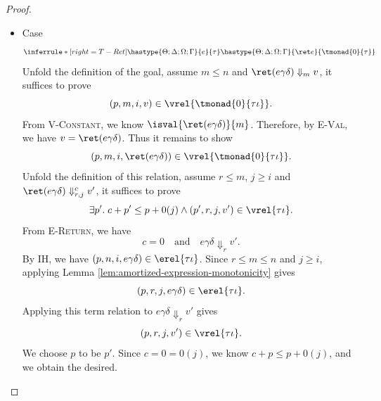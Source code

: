 \begin{proof}
\begin{itemize}
\begin{itemize}
\item {Subcase $m=k+1$.}
From \textsc{E-NappInd}, there exist $x, e', v_2$ and $v'$ such that
\[
  e_1\gamma\delta \Downarrow_{k+1}\delay(\tlam{x}{e'}), \quad
  e_2\gamma\delta \Downarrow_{k+1}\delay v_2, \quad
  e'[v_2/x] \Downarrow_k v',\quad v =\delay v'.
\]
IH1 and IH2 give
\[
  (p_1, n, i, e_1\gamma\delta)\in\erel{\triangleright(\tau_1\iota\multimap\tau_2\iota)},
  \quad
  (p_2, n, i, e_2\gamma\delta)\in\erel{\triangleright\tau_1\iota}.
\]
Since $k+1 \leq n$, instantiate these two term relations with $e_1\gamma\delta \Downarrow_{k+1}\delay(\tlam{x}{e'})$
and $e_2\gamma\delta \Downarrow_{k+1}\delay v_2$ respectively, we have
\[
  (p_1, k+1, i, \delay(\tlam{x}{e'}))\in\vrel{\triangleright(\tau_1\iota\multimap\tau_2\iota)},
  \quad
  (p_2, k+1, i, \delay v_2)\in\vrel{\triangleright\tau_1\iota}.
\]
Unfolding the definitions of the relations gives
\[
  (p_1, k, i+1, \tlam{x}{e'})\in\vrel{\tau_1\iota\multimap\tau_2\iota},
  \quad
  (p_2, k, i+1, v_2)\in\vrel{\tau_1\iota}.
\]
Unfolding the first value relation and instantiating it with $p_2, k, i+1$ and the second value relation gives
\[(p_1+p_2, k, i+1, e'[v_2/x])\in\erel{\tau_2\iota}.\]
Instantiating this term relation with $e'[v_2/x]\Downarrow_k v'$
gives $(p_1+p_2, k, i+1, v')\in\vrel{\tau_2\iota}$. Since $p_1+p_2 = p$, by the definition of
$\vrel{\triangleright\tau_2\iota}$, we have the desired:
\[(p, k+1, i, \delay v')\in\vrel{\triangleright\tau_2\iota}.\]
\end{itemize}

\item Case
\[
  \inferrule*[right=T-Ret]
        {\hastype{\Theta;\Delta;\Omega;\Gamma}{e}{\tau}}
        {\hastype{\Theta;\Delta;\Omega;\Gamma}{\ret e}{\tmonad{0}{\tau}}}
\]
Unfold the definition of the goal, assume $m\leq n$ and
$\ret(e\gamma\delta)\Downarrow_m v$, it suffices to prove
\[(p, m, i, v)\in\vrel{\tmonad{0}{\tau\iota}}.\]
From \textsc{V-Constant}, we know $\isval{\ret(e\gamma\delta)}{m}$.
Therefore, by \textsc{E-Val}, we have $v = \ret(e\gamma\delta)$. Thus it remains to show
\[(p, m, i, \ret(e\gamma\delta))\in\vrel{\tmonad{0}{\tau\iota}}.\]
Unfold the definition of this relation, assume $r\leq m$, $j\geq i$ and
$\ret(e\gamma\delta)\Downarrow^c_{r,j}v'$, it suffices to prove
\[\exists p'.\;c+p' \leq p+0(j) \land (p', r, j, v')\in\vrel{\tau\iota}.\]
From \textsc{E-Return}, we have
\[
  c=0
  \quad\text{and}\quad
  e\gamma\delta\Downarrow_r v'.
\]
By IH, we have $(p, n, i, e\gamma\delta) \in \erel{\tau\iota}$. Since $r \leq m \leq n$ and $j \ge i$,
applying Lemma \ref{lem:amortized-expression-monotonicity} gives
\[(p, r, j, e\gamma\delta) \in \erel{\tau\iota}.\]
Applying this term relation to $e\gamma\delta\Downarrow_r v'$ gives
\[(p, r, j, v')\in\vrel{\tau\iota}.\]
We choose $p$ to be $p'$. Since $c = 0 = 0(j)$, we know $c+p \leq p+0(j)$, and we obtain the desired.


\end{itemize}
\end{proof}
